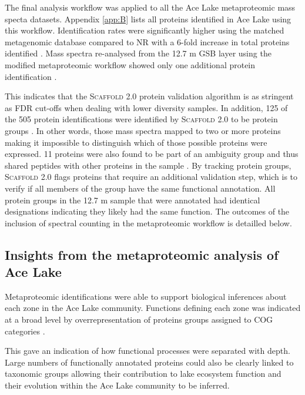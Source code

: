 The final analysis workflow was applied to all the Ace Lake metaproteomic mass specta datasets.
Appendix \ref{app:B} lists all proteins identified in Ace Lake using this workflow. 
Identification rates were significantly higher using the matched metagenomic database compared to \ac{NR} with a 6-fold increase in total proteins identified . 
Mass spectra re-analysed from the 12.7 m \ac{GSB} layer using the modified metaproteomic workflow showed only one additional protein identification .

This indicates that the \textsc{Scaffold} 2.0 protein validation algorithm is as stringent as \ac{FDR} cut-offs when dealing with lower diversity samples.
In addition, 125 of the 505 protein identifications were identified by \textsc{Scaffold} 2.0 to be protein groups .
In other words, those mass spectra mapped to two or more proteins making it impossible to distinguish which of those possible proteins were expressed.
11 proteins were also found to be part of an ambiguity group and thus shared peptides with other proteins in the sample .
By tracking protein groups, \textsc{Scaffold} 2.0 flags proteins that require an additional validation step, which is to verify if all members of the group have the same functional annotation.
All protein groups in the 12.7 m sample that were annotated had identical designations indicating they likely had the same function.
The outcomes of the inclusion of spectral counting in the metaproteomic workflow is detailled below.

\subsection[Insights from the metaproteomic analysis of Ace Lake]{Insights from the metaproteomic analysis of Ace Lake}

Metaproteomic identifications were able to support biological inferences about each zone in the Ace Lake community.
Functions defining each zone was indicated at a broad level by overrepresentation of proteins groups assigned to \ac{COG} categories . 

This gave an indication of how functional processes were separated with depth.
Large numbers of functionally annotated proteins could also be clearly linked to taxonomic groups allowing their contribution to lake ecosystem function and their evolution within the Ace Lake community to be inferred.


